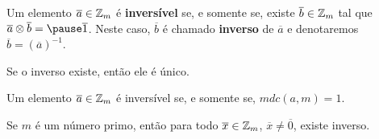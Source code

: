 \documentclass{beamer}
\begin{document}
    \begin{frame}
        \begin{definicao}
            Um elemento $\overline{a} \in \mathbb{Z}_m$ é \textbf{inversível} \pause se, e somente se, existe $\overline{b} \in \mathbb{Z}_m$ \pause tal que $\overline{a} \otimes \overline{b} = \pause \overline{1}$. \pause Neste caso, $\overline{b}$ \pause é chamado \textbf{inverso} de $\overline{a}$ \pause e denotaremos $\overline{b} = (\overline{a})^{-1}$.\pause
        \end{definicao}

        \begin{proposicao}
            Se o inverso existe, \pause então ele é único.
        \end{proposicao}
    \end{frame}

    \begin{frame}
        \begin{proposicao}
            Um elemento $\overline{a} \in \mathbb{Z}_m$ é \pause inversível \pause se, e somente se, $mdc(a,m) = 1$.\pause
        \end{proposicao}

        \begin{corolario}
            Se $m$ é um número primo, \pause então para todo $\overline{x} \in \mathbb{Z}_m$, \pause $\overline{x} \ne \overline{0}$, \pause existe inverso.
        \end{corolario}
    \end{frame}
\end{document}
